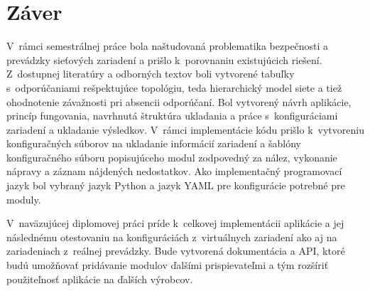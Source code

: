\chapter*{Záver}
{}

V~rámci semestrálnej práce bola naštudovaná problematika bezpečnosti a prevádzky sieťových zariadení a prišlo k~porovnaniu existujúcich riešení. Z~dostupnej literatúry a odborných textov boli vytvorené tabuľky s~odporúčaniami rešpektujúce topológiu, teda hierarchický model siete a tiež ohodnotenie závažnosti pri absencii odporúčaní. Bol vytvorený návrh aplikácie, princíp fungovania, navrhnutá štruktúra ukladania a práce s~konfiguráciami zariadení a ukladanie výsledkov. V~rámci implementácie kódu prišlo k~vytvoreniu konfiguračných súborov na ukladanie informácií zariadení a šablóny konfiguračného súboru popisujúceho modul zodpovedný za nález, vykonanie nápravy a záznam nájdených nedostatkov. Ako implementačný programovací jazyk bol vybraný jazyk Python a jazyk YAML pre konfigurácie potrebné pre moduly.

V~naväzujúcej diplomovej práci príde k~celkovej implementácii aplikácie a jej následnému otestovaniu na konfiguráciách z~virtuálnych zariadení ako aj na zariadeniach z~reálnej prevádzky. Bude vytvorená dokumentácia a API, ktoré budú umožňovať pridávanie modulov ďalšími prispievateľmi a tým rozšíriť použiteľnosť aplikácie na ďalších výrobcov. 
